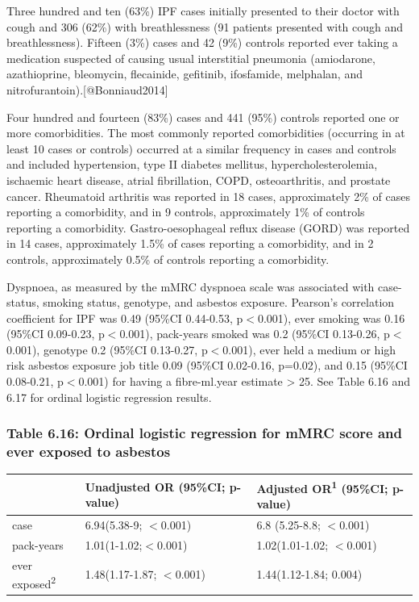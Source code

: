 Three hundred and ten (63\%) IPF cases initially presented to their
doctor with cough and 306 (62\%) with breathlessness (91 patients
presented with cough and breathlessness). Fifteen (3\%) cases and 42
(9\%) controls reported ever taking a medication suspected of causing
usual interstitial pneumonia (amiodarone, azathioprine, bleomycin,
flecainide, gefitinib, ifosfamide, melphalan, and
nitrofurantoin).{[}@Bonniaud2014{]}

Four hundred and fourteen (83\%) cases and 441 (95\%) controls reported
one or more comorbidities. The most commonly reported comorbidities
(occurring in at least 10 cases or controls) occurred at a similar
frequency in cases and controls and included hypertension, type II
diabetes mellitus, hypercholesterolemia, ischaemic heart disease, atrial
fibrillation, COPD, osteoarthritis, and prostate cancer. Rheumatoid
arthritis was reported in 18 cases, approximately 2\% of cases reporting
a comorbidity, and in 9 controls, approximately 1\% of controls
reporting a comorbidity. Gastro-oesophageal reflux disease (GORD) was
reported in 14 cases, approximately 1.5\% of cases reporting a
comorbidity, and in 2 controls, approximately 0.5\% of controls
reporting a comorbidity.

Dyspnoea, as measured by the mMRC dyspnoea scale was associated with
case-status, smoking status, genotype, and asbestos exposure. Pearson's
correlation coefficient for IPF was 0.49 (95\%CI 0.44-0.53,
p\ensuremath{<}0.001), ever smoking was 0.16 (95\%CI 0.09-0.23,
p\ensuremath{<}0.001), pack-years smoked was 0.2 (95\%CI 0.13-0.26,
p\ensuremath{<}0.001), genotype 0.2 (95\%CI 0.13-0.27,
p\ensuremath{<}0.001), ever held a medium or high risk asbestos exposure
job title 0.09 (95\%CI 0.02-0.16, p=0.02), and 0.15 (95\%CI 0.08-0.21,
p\ensuremath{<}0.001) for having a fibre-ml.year estimate \textgreater{}
25. See Table 6.16 and 6.17 for ordinal logistic regression results.

\newpage

\hypertarget{table-6.16-ordinal-logistic-regression-for-mmrc-score-and-ever-exposed-to-asbestos}{%
\subsubsection{Table 6.16: Ordinal logistic regression for mMRC score
and ever exposed to
asbestos}\label{table-6.16-ordinal-logistic-regression-for-mmrc-score-and-ever-exposed-to-asbestos}}

\begin{longtable}[]{@{}lll@{}}
\toprule
& Unadjusted OR (95\%CI; p-value) & Adjusted OR\textsuperscript{1}
(95\%CI; p-value)\tabularnewline
\midrule
\endhead
case & 6.94(5.38-9; \ensuremath{<}0.001) & 6.8 (5.25-8.8;
\ensuremath{<}0.001)\tabularnewline
pack-years & 1.01(1-1.02;\ensuremath{<}0.001) & 1.02(1.01-1.02;
\ensuremath{<}0.001)\tabularnewline
ever exposed\textsuperscript{2} & 1.48(1.17-1.87; \ensuremath{<}0.001) &
1.44(1.12-1.84; 0.004)\tabularnewline
\bottomrule
\end{longtable}

